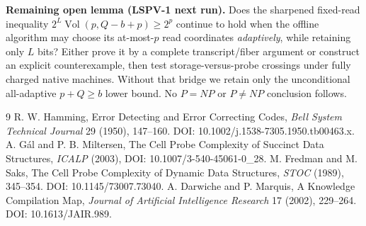 \documentclass[10pt]{article}
\newcommand{\V}{\operatorname{Vol}}
\begin{document}
\noindent\textbf{Remaining open lemma (LSPV-1 next run).} Does the sharpened fixed-read inequality $2^L\V(p,Q-b+p)\ge2^p$ continue to hold when the offline algorithm may choose its at-most-$p$ read coordinates \emph{adaptively}, while retaining only $L$ bits? Either prove it by a complete transcript/fiber argument or construct an explicit counterexample, then test storage-versus-probe crossings under fully charged native machines. Without that bridge we retain only the unconditional all-adaptive $p+Q\ge b$ lower bound. No $P=NP$ or $P\ne NP$ conclusion follows.

\begin{thebibliography}{9}
 R. W. Hamming, Error Detecting and Error Correcting Codes, \emph{Bell System Technical Journal} 29 (1950), 147--160. DOI: 10.1002/j.1538-7305.1950.tb00463.x.
 A. G\'al and P. B. Miltersen, The Cell Probe Complexity of Succinct Data Structures, \emph{ICALP} (2003), DOI: 10.1007/3-540-45061-0\_28.
 M. Fredman and M. Saks, The Cell Probe Complexity of Dynamic Data Structures, \emph{STOC} (1989), 345--354. DOI: 10.1145/73007.73040.
 A. Darwiche and P. Marquis, A Knowledge Compilation Map, \emph{Journal of Artificial Intelligence Research} 17 (2002), 229--264. DOI: 10.1613/JAIR.989.
\end{thebibliography}
\end{document}
